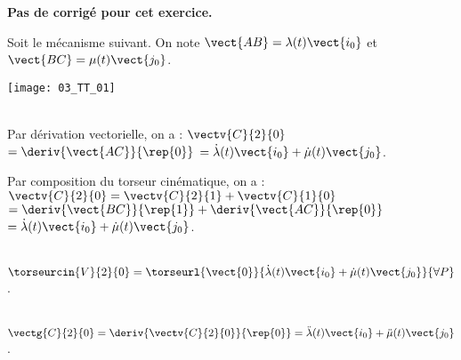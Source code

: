 \normaltrue
\correctiontrue



\setcounter{numques}{0}
\ifcorrection
\else
\textbf{Pas de corrigé pour cet exercice.}
\fi

\ifprof
\else
Soit le mécanisme suivant. On note $\vect{AB}=\lambda(t)\vect{i_0}$ et $\vect{BC}=\mu(t)\vect{j_0}$.
\begin{center}
\texttt{[image: 03\_TT\_01]}
\end{center}
\fi

\ifprof
\else
{}
\fi

\ifprof~\\ 

Par dérivation vectorielle, on a : $\vectv{C}{2}{0} $
$ = \deriv{\vect{AC}}{\rep{0}}$
$ = \dot{\lambda}(t)\vect{i_0}+\dot{\mu}(t)\vect{j_0}$.

Par composition du torseur cinématique, on a : 
$\vectv{C}{2}{0} = \vectv{C}{2}{1} +\vectv{C}{1}{0}$
$ = \deriv{\vect{BC}}{\rep{1}}+\deriv{\vect{AC}}{\rep{0}}$
$ = \dot{\lambda}(t)\vect{i_0}+\dot{\mu}(t)\vect{j_0}$.
\else
\fi

\ifprof ~\\
$\torseurcin{V}{2}{0}= \torseurl{\vect{0}}{\dot{\lambda}(t)\vect{i_0}+\dot{\mu}(t)\vect{j_0}}{\forall P}$.
\else
\fi

\ifprof ~\\
 $\vectg{C}{2}{0} = \deriv{\vectv{C}{2}{0}}{\rep{0}}=\ddot{\lambda}(t)\vect{i_0}+\ddot{\mu}(t)\vect{j_0}$.
\else
\fi




